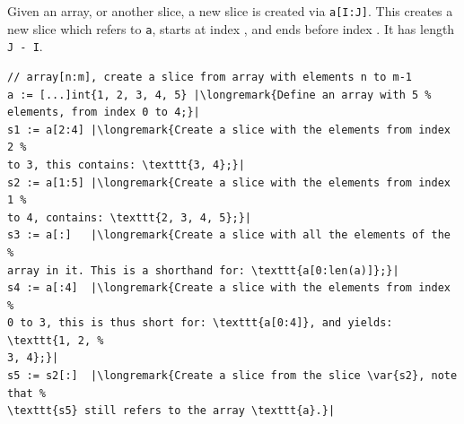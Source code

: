 Given an array, or another slice, a new slice is created via
\lstinline{a[I:J]}. This creates a new slice which refers to 
\lstinline{a}, starts at index , and ends
before index . It has length \lstinline{J - I}.

\begin{lstlisting}
// array[n:m], create a slice from array with elements n to m-1
a := [...]int{1, 2, 3, 4, 5} |\longremark{Define an array with 5 %
elements, from index 0 to 4;}|
s1 := a[2:4] |\longremark{Create a slice with the elements from index 2 %
to 3, this contains: \texttt{3, 4};}|
s2 := a[1:5] |\longremark{Create a slice with the elements from index 1 %
to 4, contains: \texttt{2, 3, 4, 5};}|
s3 := a[:]   |\longremark{Create a slice with all the elements of the %
array in it. This is a shorthand for: \texttt{a[0:len(a)]};}|
s4 := a[:4]  |\longremark{Create a slice with the elements from index %
0 to 3, this is thus short for: \texttt{a[0:4]}, and yields: \texttt{1, 2, %
3, 4};}|
s5 := s2[:]  |\longremark{Create a slice from the slice \var{s2}, note that %
\texttt{s5} still refers to the array \texttt{a}.}|
\end{lstlisting}
\showremarks

